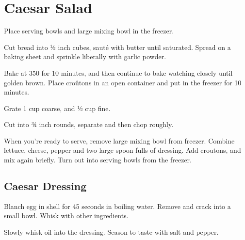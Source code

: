 \section{Caesar Salad}
\begin{recipe}

Place serving bowls and large mixing bowl in the freezer.


Cut bread into ½ inch cubes, sauté  with butter until saturated. Spread on a baking sheet and sprinkle liberally with garlic powder.

Bake at 350 for 10 minutes, and then continue to bake watching closely until golden brown.
Place croûtons in an open container and put in the freezer for 10 minutes.


Grate 1 cup coarse, and ½ cup fine.


Cut into ¾ inch rounds, separate and then chop roughly.


When you're ready to serve, remove large mixing bowl from freezer. Combine lettuce, cheese, pepper and two large spoon fulls of dressing.
Add croutons, and mix again briefly. Turn out into serving bowls from the freezer.


\subsection{Caesar Dressing}


Blanch egg in shell for 45 seconds in boiling water. Remove and crack into a small bowl. Whisk with other ingredients.


Slowly whisk oil into the dressing. Season to taste with salt and pepper.

\end{recipe}

